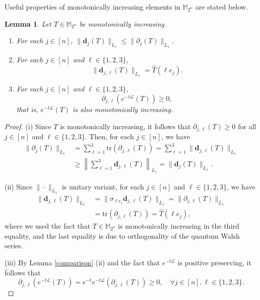 \documentclass{amsbook}
\newtheorem{lemma}[theorem]{Lemma}
\theoremstyle{definition}
\theoremstyle{remark}
\numberwithin{section}{chapter}
\numberwithin{equation}{chapter}
\newcommand{\M}{\mathbb{M}}
\newcommand{\1}{\mathbf{1}}
\newcommand{\La}{\mathcal{L}}
\newcommand{\dc}{\mathbf{d}}
\begin{document}
Useful properties of monotonically increasing elements in $\mathbb{M}_{2^n}$ are stated below.

\begin{lemma}\label{basic}
Let $T\in \M_{2^{n}}$ be monotonically increasing. 
	\begin{enumerate}[{\rm (i)}]
			\item For each $j\in [n]$, $ \|\dc_{j}(T)\|_{L_{1}}\leq \|\partial_{j}(T)\|_{L_{1}}$.
\item  For each $j\in [n]$ and $\ell\in \{1,2,3\}$, 
$$\|\dc_{j,\ell}(T)\|_{L_{1}}=\widehat{T}(\ell e_j).$$
		\item For each $j\in [n]$ and $\ell\in \{1,2,3\}$, 
		\[
		\partial_{j,\ell}\left(e^{-t\La}(T)\right)\geq 0,
		\]
that is, $e^{-t\La}(T)$ is also monotonically increasing.
	\end{enumerate}
\end{lemma}
\begin{proof}
		(i) Since $T$ is monotonically increasing, it follows that $\partial_{j,\ell}(T)\geq 0$ for all $j\in [n]$ and $\ell\in \{1,2,3\}$. Then, for each $j\in [n]$, we have
	\begin{align*}
		\|\partial_{j}(T)\|_{L_{1}}&=\sum_{\ell=1}^{3}\mathrm{tr}\left(\partial_{j,\ell}(T)\right)=\sum_{\ell=1}^{3}\|\dc_{j,\ell}(T)\|_{L_{1}}\\
		&\geq \left\|\sum_{\ell=1}^{3}\dc_{j,\ell}(T)\right\|_{L_{1}}=\|\dc_{j}(T)\|_{L_{1}}.
	\end{align*}
	
	
(ii) Since $\|\cdot\|_{L_1}$ is unitary variant, for each $j\in [n]$ and $\ell\in \{1,2,3\}$, we have
\begin{align*}
	\|\dc_{j,\ell}(T)\|_{L_{1}}&=\|\sigma_{\ell e_j}\dc_{j,\ell}(T)\|_{L_{1}}=\|\partial_{j,\ell}(T)\|_{L_1}\\
	&=\mathrm{tr}(\partial_{j,\ell}(T))=\widehat{T}(\ell e_j),
\end{align*}
where we used the fact that $T\in \M_{2^{n}}$ is monotonically increasing in the third equality, and the last equality is due to orthogonality of the quantum Walsh series. 
	
	(iii)  By Lemma \ref{comparison} (ii) and the fact that $e^{-t\La}$ is positive preserving, it follows that
	\[
	\partial_{j,\ell}\left(e^{-t\La}(T)\right)=e^{-t}e^{-t\La}\left(\partial_{j,\ell}(T)\right)\geq 0, \quad \forall j\in [n], \ell\in \{1,2,3\}.
	\]
\end{proof}
\end{document}
